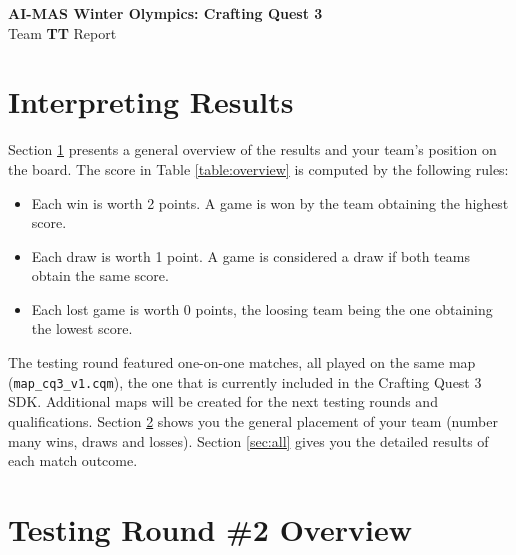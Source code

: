 \documentclass[a4paper,12pt]{article}
\begin{document}
\begin{center}
  {\huge \textbf{AI-MAS Winter Olympics: Crafting Quest 3}} \\
  {\huge Team \textbf{ TT } Report}
\end{center}


\section{Interpreting Results}
\label{sec:overview}

\par Section \ref{sec:overview} presents a general overview of the
results and your team's position on the board. The score in Table
\ref{table:overview} is computed by the following rules:
\begin{itemize}
\item Each win is worth 2 points. A game is won by the team obtaining
  the highest score.
\item Each draw is worth 1 point. A game is considered a draw if both
  teams obtain the same score.
\item Each lost game is worth 0 points, the loosing team being the one
  obtaining the lowest score.
\end{itemize}

The testing round featured one-on-one matches, all played on the same
map (\verb|map_cq3_v1.cqm|), the one that is currently included in the
Crafting Quest 3 SDK. Additional maps will be created for the next
testing rounds and qualifications.  Section \ref{sec:general} shows
you the general placement of your team (number many wins, draws and
losses).  Section \ref{sec:all} gives you the detailed results of each
match outcome.

\section{Testing Round \#2 Overview}
\label{sec:general}
\end{document}
